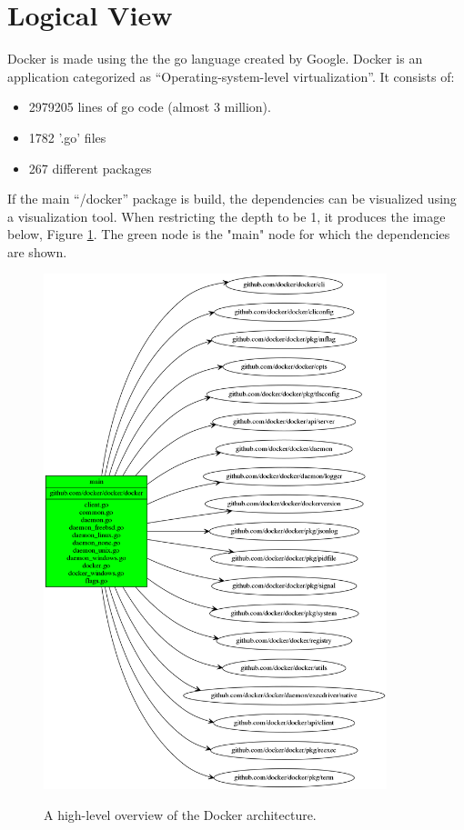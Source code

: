 
\section{Logical View}
\label{sec:viewlogical}


Docker is made using the the go language created by Google. Docker is an application categorized as ``Operating-system-level virtualization''. It consists of:
\begin{itemize}
\item 2979205 lines of go code (almost 3 million).
\item 1782 '.go' files
\item 267 different packages
\end{itemize}

If the main ``/docker'' package is build, the dependencies can be visualized using a  visualization tool. When restricting the depth to be 1, it produces the image below, Figure \ref{fig:dockerdep1}. The green node is the "main" node for which the dependencies are shown.

\begin{figure}[H]
\caption{A high-level overview of the Docker architecture.}
\centering
\includegraphics[width=\linewidth, height=15cm]{images/dependencyGraphs/goviz/govizgreendocker1.png}
\label{fig:dockerdep1}
\end{figure}

